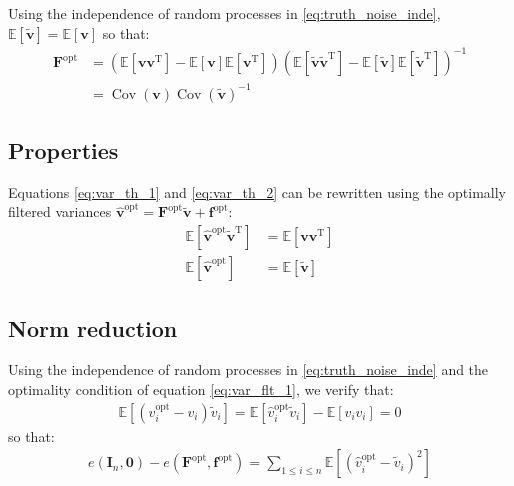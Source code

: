 \documentclass[12pt]{scrartcl}
\DeclareMathOperator{\Cov}{Cov}
\begin{document}
Using the independence of random processes in \eqref{eq:truth_noise_inde}, $\mathbb{E}\left[\widetilde{\mathbf{v}}\right] = \mathbb{E}\left[\mathbf{v}\right]$ so that:
\begin{align}
\label{eq:opt_var_filter}
\mathbf{F}^\mathrm{opt} & = \left(\mathbb{E}\left[\mathbf{v} \mathbf{v}^\mathrm{T}\right] - \mathbb{E}\left[\mathbf{v}\right] \mathbb{E}\left[\mathbf{v}^\mathrm{T}\right]\right)\left(\mathbb{E}\left[\widetilde{\mathbf{v}} \widetilde{\mathbf{v}}^\mathrm{T}\right] - \mathbb{E}\left[\widetilde{\mathbf{v}}\right] \mathbb{E}\left[\widetilde{\mathbf{v}}^\mathrm{T}\right]\right)^{-1} \nonumber \\
& = \Cov\left(\mathbf{v}\right) \Cov\left(\widetilde{\mathbf{v}}\right)^{-1}
\end{align}

\subsection{Properties}
Equations \eqref{eq:var_th_1} and \eqref{eq:var_th_2} can be rewritten using the optimally filtered variances $\widehat{\mathbf{v}}^\mathrm{opt} = \mathbf{F}^\mathrm{opt} \widetilde{\mathbf{v}} + \mathbf{f}^\mathrm{opt}$:
\begin{subequations}
\begin{align}
\label{eq:var_flt_1}
\mathbb{E}\left[\widehat{\mathbf{v}}^\mathrm{opt} \widetilde{\mathbf{v}}^\mathrm{T}\right] & = \mathbb{E}\left[\mathbf{v} \mathbf{v}^\mathrm{T}\right] \\
\label{eq:var_flt_2}
\mathbb{E}\left[\widehat{\mathbf{v}}^\mathrm{opt} \right] & = \mathbb{E}\left[\widetilde{\mathbf{v}}\right]
\end{align}
\end{subequations}

\subsection{Norm reduction}
Using the independence of random processes in \eqref{eq:truth_noise_inde} and the optimality condition of equation \eqref{eq:var_flt_1}, we verify that:
\begin{align}
\mathbb{E}\left[\left(\widehat{v}_i^\mathrm{opt} - v_i\right) \widetilde{v}_i \right] = \mathbb{E}\left[\widehat{v}_i^\mathrm{opt} \widetilde{v}_i\right] - \mathbb{E} \left[v_i v_i \right] = 0
\end{align}
so that:
\begin{align}
e\left(\mathbf{I}_n,\boldsymbol{0}\right) - e\left(\mathbf{F}^\mathrm{opt},\mathbf{f}^\mathrm{opt}\right) = \sum_{1 \le i \le n} \mathbb{E}\left[ \left(\widehat{v}_i^\mathrm{opt} - \widetilde{v}_i\right)^2\right] 
\end{align}
\end{document}
